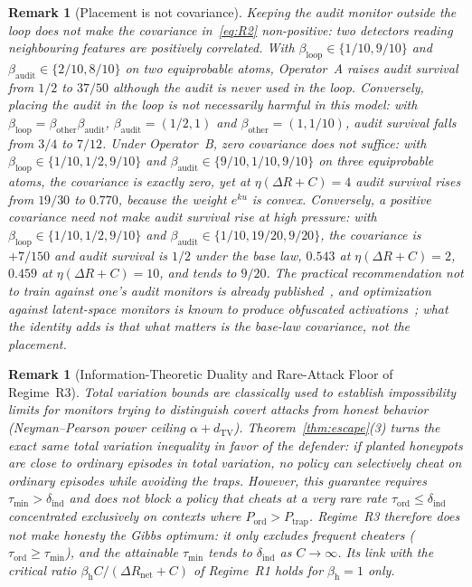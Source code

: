 \documentclass[11pt,a4paper]{article}
\newtheorem{remark}[theorem]{Remark}
\newcommand{\dTV}{d_{\mathrm{TV}}}
\begin{document}
\begin{remark}[Placement is not covariance]\label{rem:decoupling}
Keeping the audit monitor outside the loop does not make the covariance in~\eqref{eq:R2} non-positive: two detectors reading neighbouring features are positively correlated. With $\beta_{\mathrm{loop}} \in \{1/10, 9/10\}$ and $\beta_{\mathrm{audit}} \in \{2/10, 8/10\}$ on two equiprobable atoms, Operator~A raises audit survival from $1/2$ to $37/50$ although the audit is never used in the loop. Conversely, placing the audit in the loop is not necessarily harmful in this model: with $\beta_{\mathrm{loop}} = \beta_{\mathrm{other}}\beta_{\mathrm{audit}}$, $\beta_{\mathrm{audit}} = (1/2, 1)$ and $\beta_{\mathrm{other}} = (1, 1/10)$, audit survival falls from $3/4$ to $7/12$. Under Operator~B, zero covariance does not suffice: with $\beta_{\mathrm{loop}} \in \{1/10, 1/2, 9/10\}$ and $\beta_{\mathrm{audit}} \in \{9/10, 1/10, 9/10\}$ on three equiprobable atoms, the covariance is exactly zero, yet at $\eta(\Delta R + C) = 4$ audit survival rises from $19/30$ to $0.770$, because the weight $e^{ku}$ is convex. Conversely, a positive covariance need not make audit survival rise at high pressure: with $\beta_{\mathrm{loop}} \in \{1/10, 1/2, 9/10\}$ and $\beta_{\mathrm{audit}} \in \{1/10, 19/20, 9/20\}$, the covariance is $+7/150$ and audit survival is $1/2$ under the base law, $0.543$ at $\eta(\Delta R + C) = 2$, $0.459$ at $\eta(\Delta R + C) = 10$, and tends to $9/20$. The practical recommendation not to train against one's audit monitors is already published~\cite{baker2025,korbak2025}, and optimization against latent-space monitors is known to produce obfuscated activations~\cite{bailey2024}; what the identity adds is that what matters is the base-law covariance, not the placement.
\end{remark}

\begin{remark}[Information-Theoretic Duality and Rare-Attack Floor of Regime~R3]
Total variation bounds are classically used to establish impossibility limits for \emph{monitors} trying to distinguish covert attacks from honest behavior (Neyman--Pearson power ceiling $\alpha + \dTV$). Theorem~\ref{thm:escape}(3) turns the exact same total variation inequality in favor of the \emph{defender}: if planted honeypots are close to ordinary episodes in total variation, no policy can selectively cheat on ordinary episodes while avoiding the traps. However, this guarantee requires $\tau_{\min} > \delta_{\mathrm{ind}}$ and does not block a policy that cheats at a very rare rate $\tau_{\mathrm{ord}} \le \delta_{\mathrm{ind}}$ concentrated exclusively on contexts where $P_{\mathrm{ord}} > P_{\mathrm{trap}}$. Regime~R3 therefore does not make honesty the Gibbs optimum: it only excludes frequent cheaters ($\tau_{\mathrm{ord}} \ge \tau_{\min}$), and the attainable $\tau_{\min}$ tends to $\delta_{\mathrm{ind}}$ as $C \to \infty$. Its link with the critical ratio $\beta_{\mathrm{h}}C/(\Delta R_{\mathrm{net}} + C)$ of Regime~R1 holds for $\beta_{\mathrm{h}} = 1$ only.
\end{remark}
\end{document}

